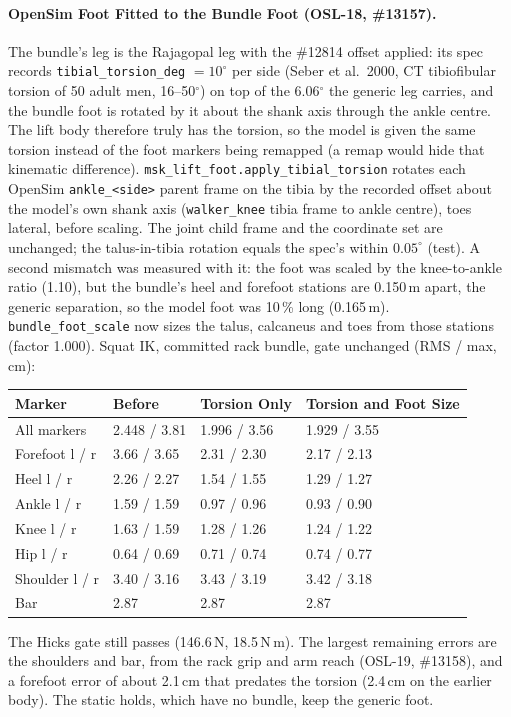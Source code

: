 \documentclass[11pt,a4paper]{article}
\begin{document}
\paragraph{OpenSim Foot Fitted to the Bundle Foot (OSL-18, \#13157).}
The bundle's leg is the Rajagopal leg with the \#12814 offset applied: its
spec records \texttt{tibial\_torsion\_deg} $=10^\circ$ per side (Seber et
al.\ 2000, CT tibiofibular torsion of 50 adult men, 16--50$^\circ$) on top of
the 6.06$^\circ$ the generic leg carries, and the bundle foot is rotated by it
about the shank axis through the ankle centre. The lift body therefore truly
has the torsion, so the model is given the same torsion instead of the foot
markers being remapped (a remap would hide that kinematic difference).
\texttt{msk\_lift\_foot.apply\_tibial\_torsion} rotates each OpenSim
\texttt{ankle\_<side>} parent frame on the tibia by the recorded offset about
the model's own shank axis (\texttt{walker\_knee} tibia frame to ankle
centre), toes lateral, before scaling. The joint child frame and the coordinate
set are unchanged; the talus-in-tibia rotation equals the spec's within
$0.05^\circ$ (test). A second mismatch was measured with it: the foot was
scaled by the knee-to-ankle ratio (1.10), but the bundle's heel and forefoot
stations are 0.150\,m apart, the generic separation, so the model foot was
10\,\% long (0.165\,m). \texttt{bundle\_foot\_scale} now sizes the talus,
calcaneus and toes from those stations (factor 1.000). Squat IK, committed
rack bundle, gate unchanged (RMS / max, cm):
\begin{center}\footnotesize\setlength{\tabcolsep}{3pt}
\begin{tabular}{llll}
\toprule
Marker & Before & Torsion Only & Torsion and Foot Size\\
\midrule
All markers & 2.448 / 3.81 & 1.996 / 3.56 & 1.929 / 3.55\\
Forefoot l / r & 3.66 / 3.65 & 2.31 / 2.30 & 2.17 / 2.13\\
Heel l / r & 2.26 / 2.27 & 1.54 / 1.55 & 1.29 / 1.27\\
Ankle l / r & 1.59 / 1.59 & 0.97 / 0.96 & 0.93 / 0.90\\
Knee l / r & 1.63 / 1.59 & 1.28 / 1.26 & 1.24 / 1.22\\
Hip l / r & 0.64 / 0.69 & 0.71 / 0.74 & 0.74 / 0.77\\
Shoulder l / r & 3.40 / 3.16 & 3.43 / 3.19 & 3.42 / 3.18\\
Bar & 2.87 & 2.87 & 2.87\\
\bottomrule
\end{tabular}
\end{center}
The Hicks gate still passes (146.6\,N, 18.5\,N\,m). The largest remaining
errors are the shoulders and bar, from the rack grip and arm reach (OSL-19,
\#13158), and a forefoot error of about 2.1\,cm that predates the torsion
(2.4\,cm on the earlier body). The static holds, which have no bundle, keep
the generic foot.
\end{document}
